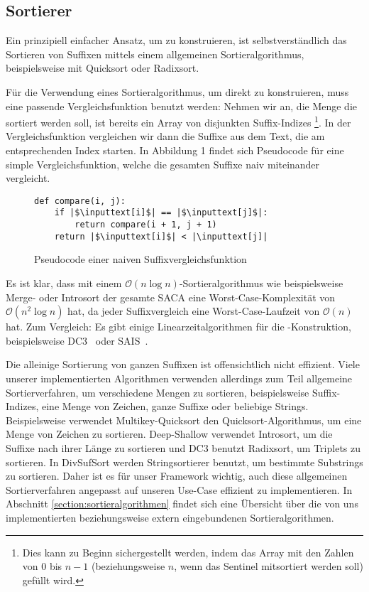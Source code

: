 \subsection{Sortierer}
Ein  prinzipiell einfacher Ansatz, um \sa zu konstruieren,
ist selbstverständlich das Sortieren von Suffixen mittels einem allgemeinen Sortieralgorithmus,
beispielsweise mit Quicksort oder Radixsort.

Für die Verwendung eines Sortieralgorithmus, um \sa direkt zu konstruieren,
muss eine passende Vergleichsfunktion benutzt werden:
Nehmen wir an, die Menge die sortiert werden soll, ist bereits ein Array von disjunkten Suffix-Indizes
\footnote{Dies kann zu Beginn sichergestellt werden, indem das
Array mit den Zahlen von 0 bis $n-1$ (beziehungsweise $n$, wenn das Sentinel mitsortiert werden soll) gefüllt wird.}.
In der Vergleichsfunktion vergleichen wir dann die Suffixe aus dem Text, die am entsprechenden Index starten.
In Abbildung 1 findet sich Pseudocode für eine simple Vergleichsfunktion,
welche die gesamten Suffixe naiv miteinander vergleicht.

\begin{figure}[!h]
\begin{verbatim}
def compare(i, j):
    if |$\inputtext[i]$| == |$\inputtext[j]$|:
        return compare(i + 1, j + 1)
    return |$\inputtext[i]$| < |\inputtext[j]|
\end{verbatim}
\caption{Pseudocode einer naiven Suffixvergleichsfunktion}
\end{figure}
%
Es ist klar, dass mit einem $\mathcal O(n \log n)$-Sortieralgorithmus wie beispielsweise Merge- oder Introsort
der gesamte SACA eine Worst-Case-Komplexität von\\ $\mathcal O(n^2 \log n)$ hat, da jeder Suffixvergleich
eine Worst-Case-Laufzeit von $\mathcal O(n)$ hat.
Zum Vergleich: Es gibt einige Linearzeitalgorithmen für die \sa-Konstruktion, beispielsweise DC3~\cite{saca:9} oder SAIS~\cite{saca:6}.

Die alleinige Sortierung von ganzen Suffixen ist offensichtlich nicht effizient.
Viele unserer implementierten Algorithmen verwenden allerdings zum Teil allgemeine Sortierverfahren,
um verschiedene Mengen zu sortieren,
beispielsweise Suffix-Indizes, eine Menge von Zeichen, ganze Suffixe oder beliebige Strings.
Beispielsweise verwendet Multikey-Quicksort den Quicksort-Algorithmus, um eine Menge von Zeichen zu sortieren.
Deep-Shallow verwendet Introsort, um die Suffixe nach ihrer Länge zu sortieren
und DC3 benutzt Radixsort, um Triplets zu sortieren.
In DivSufSort werden Stringsortierer benutzt, um bestimmte Substrings zu sortieren.
Daher ist es für unser Framework wichtig, auch diese allgemeinen Sortierverfahren angepasst
auf unseren Use-Case effizient zu implementieren.
In Abschnitt \ref{section:sortieralgorithmen} findet sich eine Übersicht über die von uns
implementierten beziehungsweise extern eingebundenen Sortieralgorithmen.
